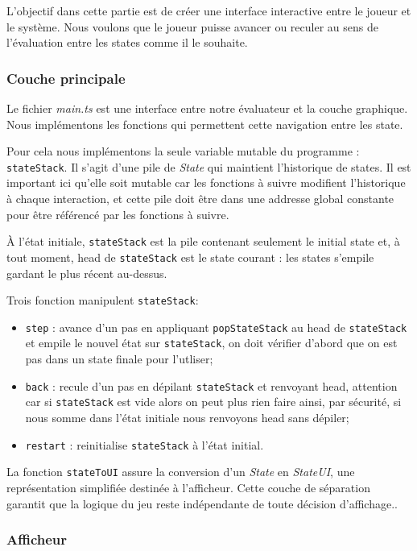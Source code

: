L'objectif dans cette partie est de créer une interface interactive entre le joueur et le système. Nous voulons que le joueur puisse avancer ou reculer au sens de l’évaluation entre les states comme il le souhaite.

\subsubsection{Couche principale}

Le fichier \textit{main.ts} est une interface entre notre évaluateur et la couche graphique. Nous implémentons les fonctions qui permettent cette navigation entre les state.

Pour cela nous implémentons la seule variable mutable du programme : \texttt{stateStack}. Il s’agit d’une pile de \textit{State} qui maintient l’historique de states. Il est important ici qu'elle soit mutable car les fonctions à suivre modifient l'historique à chaque interaction, et cette pile doit être dans une addresse global constante pour être référencé par les fonctions à suivre. 

\`A l’état initiale, \texttt{stateStack} est la pile contenant seulement le initial state et, à tout moment, head de \texttt{stateStack} est le state courant : les states s’empile gardant le plus récent au-dessus.

Trois fonction manipulent \texttt{stateStack}:
\begin{itemize} 
\item \texttt{step} : avance d'un pas en appliquant \texttt{popStateStack} au head de \texttt{stateStack} et empile le nouvel état sur \texttt{stateStack}, on doit vérifier d’abord que on est pas dans un state finale pour l'utliser; 
\item \texttt{back} : recule d'un pas en dépilant \texttt{stateStack} et renvoyant head, attention car si \texttt{stateStack} est vide alors on peut plus rien faire ainsi, par sécurité, si nous somme dans l’état initiale nous renvoyons head sans dépiler; 
\item \texttt{restart} : reinitialise \texttt{stateStack} à l'état initial. 
\end{itemize}

La fonction \texttt{stateToUI} assure la conversion d'un \textit{State} en \textit{StateUI}, une représentation simplifiée destinée à l'afficheur. Cette couche de séparation garantit que la logique du jeu reste indépendante de toute décision d'affichage..

\subsubsection{Afficheur}

